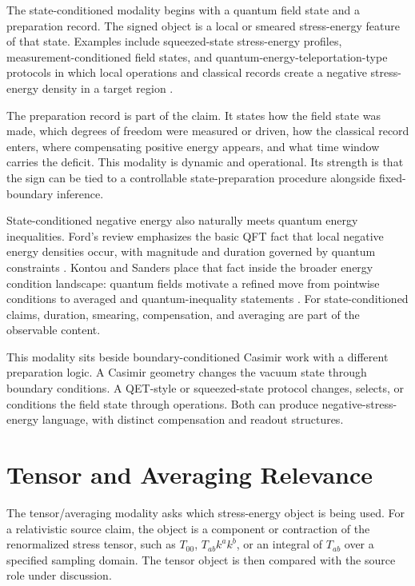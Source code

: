 \documentclass[11pt]{article}
\newcommand{\Tabmunu}{T_{ab}}
\newcommand{\Tnn}{T_{ab}k^ak^b}
\newcommand{\Ttt}{T_{00}}
\begin{document}
The state-conditioned modality begins with a quantum field state and a
preparation record. The signed object is a local or smeared stress-energy
feature of that state. Examples include squeezed-state stress-energy profiles,
measurement-conditioned field states, and
quantum-energy-teleportation-type protocols in which local operations and
classical records create a negative stress-energy density in a target region
\cite{Ford2009,FunaiMartinMartinez2017}.

The preparation record is part of the claim. It states how the field state was
made, which degrees of freedom were measured or driven, how the classical
record enters, where compensating positive energy appears, and what time
window carries the deficit. This modality is dynamic and operational. Its
strength is that the sign can be tied to a controllable state-preparation
procedure alongside fixed-boundary inference.

State-conditioned negative energy also naturally meets quantum energy
inequalities. Ford's review emphasizes the basic QFT fact that local negative
energy densities occur, with magnitude and duration governed by quantum
constraints \cite{Ford2009}. Kontou and Sanders place that fact inside the
broader energy condition landscape: quantum fields motivate a refined move
from pointwise conditions to averaged and quantum-inequality statements
\cite{KontouSanders2020}. For state-conditioned claims, duration, smearing,
compensation, and averaging are part of the observable content.

This modality sits beside boundary-conditioned Casimir work with a different
preparation logic. A Casimir geometry changes the vacuum state through
boundary conditions. A QET-style or squeezed-state protocol changes, selects,
or conditions the field state through operations. Both can produce
negative-stress-energy language, with distinct compensation and readout
structures.

\section{Tensor and Averaging Relevance}

The tensor/averaging modality asks which stress-energy object is being used.
For a relativistic source claim, the object is a component or contraction of
the renormalized stress tensor, such as \(\Ttt\), \(\Tnn\), or an integral of
\(\Tabmunu\) over a specified sampling domain. The tensor object is then
compared with the source role under discussion.
\end{document}

